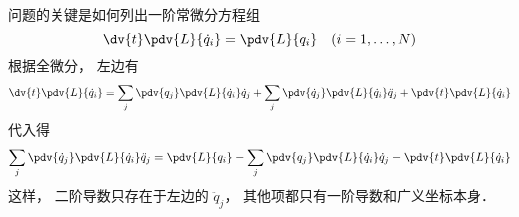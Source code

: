 
\begin{issues}
\issueDraft
\end{issues}


问题的关键是如何列出一阶常微分方程组
\begin{equation}
\dv{t} \pdv{L}{\dot q_i} = \pdv{L}{q_i}
\quad (i=1,\dots,N)
\end{equation}
根据全微分， 左边有
\begin{equation}
\dv{t} \pdv{L}{\dot q_i} = \sum_j\pdv{q_j}\pdv{L}{\dot q_i}\dot q_j + \sum_j\pdv{\dot q_j}\pdv{L}{\dot q_i}\ddot q_j + \pdv{t}\pdv{L}{\dot q_i}
\end{equation}
代入得
\begin{equation}
\sum_j\pdv{\dot q_j}\pdv{L}{\dot q_i}\ddot q_j = \pdv{L}{q_i} - \sum_j\pdv{q_j}\pdv{L}{\dot q_i}\dot q_j - \pdv{t}\pdv{L}{\dot q_i}
\end{equation}
这样， 二阶导数只存在于左边的 $\ddot q_j$， 其他项都只有一阶导数和广义坐标本身．
